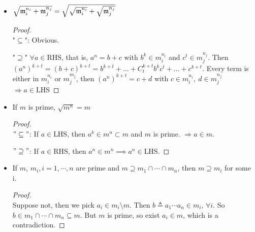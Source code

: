 \begin{prop} \leavevmode \label{prop:radical-power-relation} 
  \begin{itemize}
    \item  $\sqrt{\mathfrak{m}_i^{n_i} + \mathfrak{m}_j^{n_j}} = \sqrt{\sqrt{\mathfrak{m}_i^{n_i}} + 
      \sqrt{\mathfrak{m}_j^{n_j}}}$
      \begin{proof} $ $\\ 
        "$\subseteq$": Obvious.

        "$\supseteq$" $\forall a \in \text{RHS}$, that is, $a^n = b + c$ with 
        $b^k \in m_i^{n_i}$ and $c^t \in m_j^{n_j}$. Then 
        $(a^n)^{k+t} = (b + c)^{k + t} = b^{k+t} + \dots + C_{t}^{k+t} b^kc^t
        + \dots + c^{k+t}$. Every term is either in $m_i^{n_i}$ or $m_j^{m_j}$,
         then $(a^n)^{k+t} = c + d$ with $c \in m_i^{n_i},\ d \in m_j^{n_j}$
         $\Rightarrow a \in \text{LHS}$
      \end{proof}
    \item If $m$ is prime, $\sqrt{m^{n}} = m$
      \begin{proof} $ $\\
        $"\subseteq"$: If $a \in \text{LHS}$, then $a^k \in m^{n} \subset m$ and $m$ is prime.
        $\Rightarrow a \in m$.

        $"\supseteq"$: If $a \in \text{RHS}$, then $a^n \in m^n \implies a^n \in \text{LHS}$.
      \end{proof}
     \item If $m$, $m_i, i = 1, \cdots, n$ are prime and $m \supseteq m_1 \cap
       \cdots \cap m_n$, then $m \supseteq m_i$ for some i.
       \begin{proof} $ $\\
         Suppose not, then we pick $a_i \in m_i \setminus m$. Then $b \triangleq a_1\cdots a_n \in m_i
         , \, \forall i$. So $b \in m_1 \cap \cdots \cap m_n \subseteq m$. But
         $m$ is prime, so exist $a_i \in m$, which is a contradiction. 
       \end{proof}
  \end{itemize}
\end{prop}


